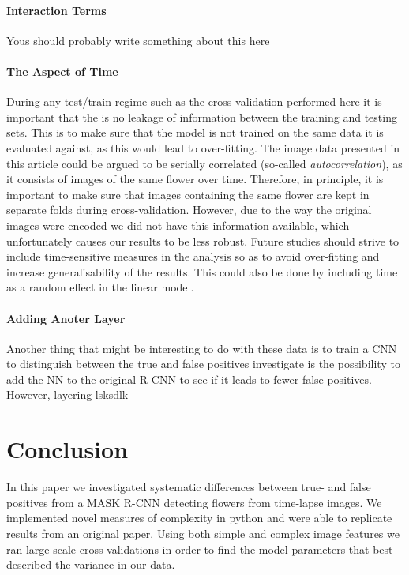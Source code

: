 \documentclass[12pt]{article}
\begin{document}
\paragraph{Interaction Terms}
Yous should probably write something about this here

\paragraph{The Aspect of Time}
During any test/train regime such as the cross-validation performed here it is important that the is no leakage of information between the training and testing sets. This is to make sure that the model is not trained on the same data it is evaluated against, as this would lead to over-fitting. The image data presented in this article could be argued to be serially correlated (so-called \textit{autocorrelation}), as it consists of images of the same flower over time. Therefore, in principle, it is important to make sure that images containing the same flower are kept in separate folds during cross-validation. However, due to the way the original images were encoded we did not have this information available, which unfortunately causes our results to be less robust. Future studies should strive to include time-sensitive measures in the analysis so as to avoid over-fitting and increase generalisability of the results. This could also be done by including time as a random effect in the linear model.

\paragraph{Adding Anoter Layer}
Another thing that might be interesting to do with these data is to train a CNN to distinguish between the true and false positives 
investigate is the possibility to add the NN to the original R-CNN to see if it leads to fewer false positives. However, layering lsksdlk

\section{Conclusion}
In this paper we investigated systematic differences between true- and false positives from a MASK R-CNN detecting flowers from time-lapse images. We implemented novel measures of complexity in python and were able to replicate results from an original paper. Using both simple and complex image features we ran large scale cross validations in order to find the model parameters that best described the variance in our data. 
\end{document}

